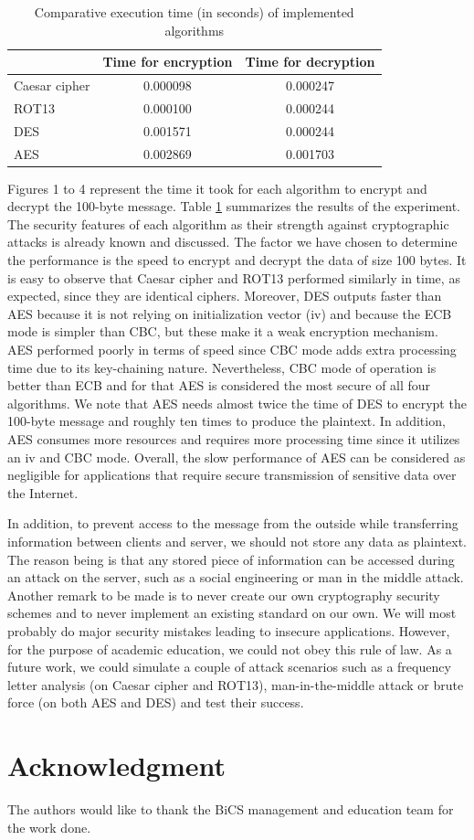 \begin{table}[h!]
\begin{tabular}{|l|c|c|}
\hline
\multicolumn{1}{|c|}{} & Time for encryption & \multicolumn{1}{l|}{Time for decryption} \\ \hline
Caesar cipher & 0.000098 & 0.000247 \\ \hline
ROT13 & 0.000100 & 0.000244 \\ \hline
DES & 0.001571 & 0.000244 \\ \hline
AES & 0.002869 & 0.001703 \\ \hline
\end{tabular}
\caption{Comparative execution time (in seconds) of implemented algorithms}
\label{results}
\end{table}


Figures 1 to 4 represent the time it took for each algorithm to encrypt and decrypt the 100-byte message. Table \ref{results} summarizes the results of the experiment. The security features of each algorithm as their strength against cryptographic attacks is already known and discussed. The factor we have chosen to determine the performance is the speed to encrypt and decrypt the data of size 100 bytes. It is easy to observe that Caesar cipher and ROT13 performed similarly in time, as expected, since they are identical ciphers. Moreover, DES outputs faster than AES because it is not relying on initialization vector (iv) and because the ECB mode is simpler than CBC, but these make it a weak encryption mechanism. AES performed poorly in terms of speed since CBC mode adds extra processing time due to its key-chaining nature. Nevertheless, CBC mode of operation is better than ECB and for that AES is considered the most secure of all four algorithms. We note that AES needs almost twice the time of DES to encrypt the 100-byte message and roughly ten times to produce the plaintext. In addition, AES consumes more resources and requires more processing time since it utilizes an iv and CBC mode. Overall, the slow performance of AES can be considered as negligible for applications that require secure transmission of sensitive data over the Internet.

In addition, to prevent access to the message from the outside while transferring information between clients and server, we should not store any data as plaintext. The reason being is that any stored piece of information can be accessed during an attack on the server, such as a social engineering or man in the middle attack. Another remark to be made is to never create our own cryptography security schemes and to never implement an existing standard on our own. We will most probably do major security mistakes leading to insecure applications. However, for the purpose of academic education, we could not obey this rule of law. 
As a future work, we could simulate a couple of attack scenarios such as a frequency letter analysis (on Caesar cipher and ROT13), man-in-the-middle attack or brute force (on both AES and DES) and test their success. 

\section*{Acknowledgment}
The authors would like to thank the BiCS management and education team for the work done.